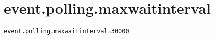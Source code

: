 \section{event.polling.maxwaitinterval}
\label{configuration:EventPollingMaxwaitinterval}
\AvailableInJavaAndCsharp{\TODO}
\begin{lstlisting}[style=Props,caption={Usage example for \textit{event.polling.maxwaitinterval}}]
event.polling.maxwaitinterval=30000
\end{lstlisting}